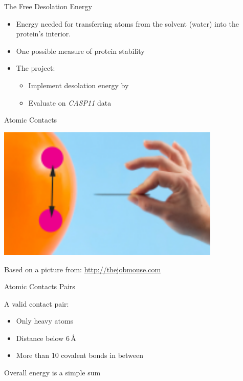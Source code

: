 \begin{frame}{The Free Desolation Energy}
    \begin{itemize}[<+->]
        \item Energy needed for transferring atoms from the solvent (water) into
        the protein's interior.
        \item One possible measure of protein stability
        \item The project:
        \begin{itemize}
            \item Implement desolation energy by \cite{Zang1998}
            \item Evaluate on \emph{CASP11} data
        \end{itemize}
    \end{itemize}
\end{frame}
% 
\begin{frame}{Atomic Contacts}
    \begin{center}
        \includegraphics[width=0.8\textwidth]{ace.png}
    \end{center}
    \begin{flushright}
        \tiny
        \color{gray}Based on a picture from: \url{http://thejobmouse.com}
    \end{flushright}
\end{frame}
%
\begin{frame}{Atomic Contacts Pairs}
    \begin{center}
    \end{center}
    A valid contact pair:
    \begin{itemize}
        \item Only heavy atoms
        \item Distance below 6\,\AA
        \item More than 10 covalent bonds in between\\
    \end{itemize}
    Overall energy is a simple sum
\end{frame}
